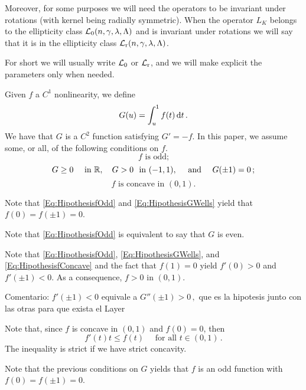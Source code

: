Moreover, for some purposes we will need the operators to be invariant under rotations (with kernel being radially symmetric). When the operator $L_K$ belongs to the ellipticity class $\mathcal{L}_0(n,\gamma,\lambda, \Lambda)$ and is invariant under rotations we will say that it is in the ellipticity class $\mathcal{L}_{\mathrm{r}}(n,\gamma,\lambda, \Lambda)$.


For short we will usually write $\mathcal{L}_0$ or $\mathcal{L}_{\mathrm{r}}$, and we will make explicit the parameters only when needed.



Given $f$ a $C^1$ nonlinearity, we define
$$
G(u)= \int_u^1 f(t) \,\mathrm{d} t\,.
$$
We have that $G$ is a $C^2$ function satisfying $G' = -f$. In this paper, we assume some, or all, of the following conditions on $f$.
\begin{equation}
\label{Eq:HipothesisfOdd}
f \textrm{ is odd;}
\end{equation}
\begin{equation}
\label{Eq:HipothesisGWells}
G\geq 0 \quad \textrm{ in } \mathbb{R}, \quad G > 0 \ \textrm{ in }  (-1,1), \quad \textrm{ and }\quad G(\pm 1 )=0\,;
\end{equation}
\begin{equation}
\label{Eq:HipothesisfConcave}
f \textrm{ is concave in }  (0,1).
\end{equation}



Note that \eqref{Eq:HipothesisfOdd} and \eqref{Eq:HipothesisGWells} yield that $f(0)=f(\pm 1)=0$. 

Note that \eqref{Eq:HipothesisfOdd} is equivalent to say that $G$ is even.

Note that \eqref{Eq:HipothesisfOdd}, \eqref{Eq:HipothesisGWells}, and \eqref{Eq:HipothesisfConcave} and the fact that $f(1)=0$ yield $f'(0)>0$ and $f'(\pm 1) < 0$. As a consequence, $f > 0$ in $(0,1)$.

Comentario: $f'(\pm 1) < 0$ equivale a $G''(\pm 1) > 0\,,$ que es la hipotesis junto con las otras para que exista el Layer

Note that, since $f$ is concave in $(0,1)$ and $f(0)=0$, then 
\begin{equation}
\label{Eq:PropertyConcavityf}
f'(t)t \leq f(t) \quad \textrm{ for all } t\in (0,1)\,.
\end{equation}
The inequality is strict if we have strict concavity.


Note that the previous conditions on $G$ yields that $f$ is an odd function with $f(0)=f(\pm 1)=0$.


